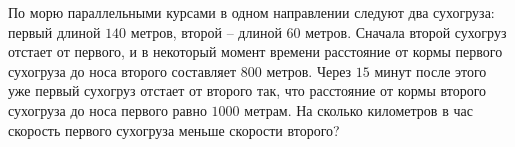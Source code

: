 \begin{ex}
	\begin{condition}
		По морю параллельными курсами в одном направлении следуют два сухогруза: первый длиной \(140\) метров, второй – длиной \( 60  \) метров. Сначала второй сухогруз отстает от первого, и в некоторый момент времени расстояние от кормы первого сухогруза до носа второго составляет \( 800  \) метров. Через \( 15  \) минут после этого уже первый сухогруз отстает от второго так, что расстояние от кормы второго сухогруза до носа первого равно \( 1000  \) метрам. На сколько километров в час скорость первого сухогруза меньше скорости второго?
	\end{condition}
\end{ex}